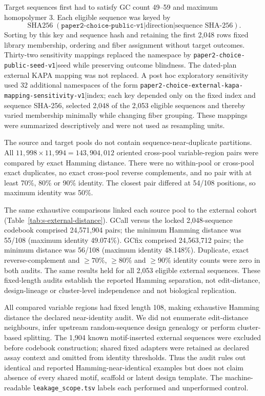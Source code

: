 \documentclass[10pt]{article}
\begin{document}
Target sequences first had to satisfy GC count 49--59 and maximum homopolymer 3. Each eligible sequence was keyed by
\[
 \operatorname{SHA256}(\texttt{paper2-choice-public-v1}|\text{direction}|\text{sequence SHA-256}).
\]
Sorting by this key and sequence hash and retaining the first 2,048 rows fixed library membership, ordering and fiber assignment without target outcomes. Thirty-two sensitivity mappings replaced the namespace by \texttt{paper2-choice-public-seed-v1}|seed while preserving outcome blindness. The dated-plan external KAPA mapping was not replaced. A post hoc exploratory sensitivity used 32 additional namespaces of the form \texttt{paper2-choice-external-kapa-mapping-sensitivity-v1}|index; each key depended only on the fixed index and sequence SHA-256, selected 2,048 of the 2,053 eligible sequences and thereby varied membership minimally while changing fiber grouping. These mappings were summarized descriptively and were not used as resampling units.

The source and target pools do not contain sequence-near-duplicate partitions. All $11{,}998\times11{,}994=143{,}904{,}012$ oriented cross-pool variable-region pairs were compared by exact Hamming distance. There were no within-pool or cross-pool exact duplicates, no exact cross-pool reverse complements, and no pair with at least 70\%, 80\% or 90\% identity. The closest pair differed at 54/108 positions, so maximum identity was 50\%.

The same exhaustive comparisons linked each source pool to the external cohort (Table~\ref{tab:s-external-distance}). GCall versus the locked 2,048-sequence codebook comprised 24,571,904 pairs; the minimum Hamming distance was 55/108 (maximum identity 49.074\%). GCfix comprised 24,563,712 pairs; the minimum distance was 56/108 (maximum identity 48.148\%). Duplicate, exact reverse-complement and $\geq70\%$, $\geq80\%$ and $\geq90\%$ identity counts were zero in both audits. The same results held for all 2,053 eligible external sequences. These fixed-length audits establish the reported Hamming separation, not edit-distance, design-lineage or cluster-level independence and not biological replication.

All compared variable regions had fixed length 108, making exhaustive Hamming distance the declared near-identity audit. We did not enumerate edit-distance neighbours, infer upstream random-sequence design genealogy or perform cluster-based splitting. The 1,904 known motif-inserted external sequences were excluded before codebook construction; shared fixed adapters were retained as declared assay context and omitted from identity thresholds. Thus the audit rules out identical and reported Hamming-near-identical examples but does not claim absence of every shared motif, scaffold or latent design template. The machine-readable \texttt{leakage\_scope.tsv} labels each performed and unperformed control.
\end{document}
